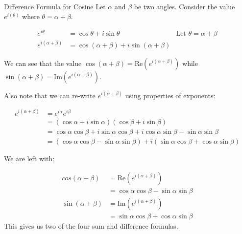 \begin{prf}{Difference Formula for Cosine}
  Let $\alpha$ and $\beta$ be two angles. Consider the value $e^{i(\theta)}$ where $\theta = \alpha + \beta$.

  \begin{align*}
    e^{i\theta} &= \cos\theta + i\sin\theta & \text{Let } \theta = \alpha+\beta\\
    e^{i(\alpha+\beta)} & = \cos(\alpha+\beta) + i\sin(\alpha + \beta)
  \end{align*}

  We can see that the value $\cos(\alpha+\beta) = \mbox{Re}(e^{i(\alpha+\beta)})$ while $\sin(\alpha+\beta) = \mbox{Im}(e^{i(\alpha+\beta)})$.

  Also note that we can re-write $e^{i(\alpha+\beta)}$ using properties of exponents:

  \begin{align*}
    e^{i(\alpha+\beta)} & = e^{i\alpha}e^{i\beta}\\
    &= (\cos\alpha+i\sin\alpha)(\cos\beta+i\sin\beta)\\
    & = \cos\alpha\cos\beta + i\sin\alpha\cos\beta + i\cos\alpha\sin\beta -\sin\alpha\sin\beta\\
    & = (\cos\alpha\cos\beta-\sin\alpha\sin\beta) + i(\sin\alpha\cos\beta + \cos\alpha\sin\beta)
  \end{align*}

  We are left with:

  \begin{align*}
    cos(\alpha+\beta) &= \mbox{Re}(e^{i(\alpha+\beta)})\\
    & = \cos\alpha\cos\beta-\sin\alpha\sin\beta\\
    \sin(\alpha+\beta) &= \mbox{Im}(e^{i(\alpha+\beta)})\\
    & = \sin\alpha\cos\beta + \cos\alpha\sin\beta
  \end{align*}
  This gives us two of the four sum and difference formulas.
\end{prf}
